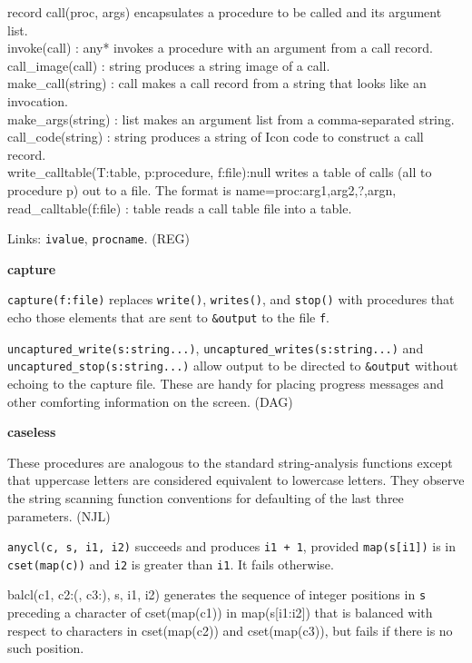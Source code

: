 \textsf{record call(proc, args)} encapsulates a procedure to be called
and its argument list.\\
\textsf{invoke(call) : any*} invokes a procedure with an argument from a
call record.\\
\textsf{call\_image(call) : string} produces a string image of a
call.\\
\textsf{make\_call(string) : call} makes a call record from a string
that looks like an invocation.\\
\textsf{make\_args(string) : list} makes an argument list from a
comma-separated string.\\
\textsf{call\_code(string) : string} produces a string of Icon code to
construct a call record.\\
\textsf{write\_calltable(T:table, p:procedure, f:file):null} writes a
table of calls (all to procedure p) out to a file. The format is
\textsf{name=proc:arg1,arg2,?,argn,}\\
\textsf{read\_calltable(f:file) : table} reads a call table file into a
table.

Links: \texttt{ivalue}, \texttt{procname}. (REG)

{\sffamily\bfseries
capture}

\texttt{capture(f:file)} replaces \texttt{write()}, \texttt{writes()},
and \texttt{stop()} with procedures that echo those elements that are
sent to \texttt{\&output} to the file \texttt{f}.

\texttt{uncaptured\_write(s:string...)},
\texttt{uncaptured\_writes(s:string...)} and
\texttt{uncaptured\_stop(s:string...)} allow output to be directed to
\texttt{\&output} without echoing to the capture file. These are handy
for placing progress messages and other comforting information on the
screen. (DAG)

{\sffamily\bfseries
caseless}

These procedures are analogous to the standard string-analysis functions
except that uppercase letters are considered equivalent to lowercase
letters. They observe the string scanning function conventions for
defaulting of the last three parameters. (NJL)

\texttt{anycl(c, s, i1, i2)} succeeds and produces \texttt{i1 + 1},
provided \texttt{map(s[i1])} is in \texttt{cset(map(c))} and
\texttt{i2} is greater than \texttt{i1}. It fails otherwise.

\textsf{balcl(c1, c2:{\textquotesingle}({\textquotesingle},
c3:{\textquotesingle}){\textquotesingle}, s, i1, i2)} generates the
sequence of integer positions in \texttt{s} preceding a character of
\textsf{cset(map(c1))} in \textsf{map(s[i1:i2])} that is balanced with
respect to characters in \textsf{cset(map(c2))} and
\textsf{cset(map(c3))}, but fails if there is no such position.

